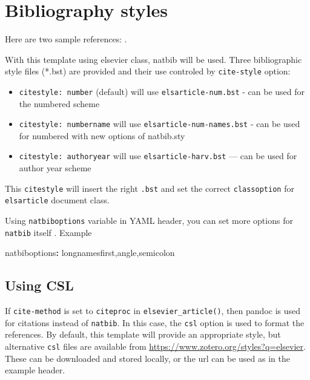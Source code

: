 \documentclass[
  authoryear,
  preprint]{elsarticle}
\newenvironment{Shaded}{\begin{snugshade}}{\end{snugshade}}
\newcommand{\AttributeTok}[1]{\textcolor[rgb]{0.40,0.45,0.13}{#1}}
\newcommand{\FunctionTok}[1]{\textcolor[rgb]{0.28,0.35,0.67}{#1}}
\newcommand{\KeywordTok}[1]{\textcolor[rgb]{0.00,0.23,0.31}{\textbf{#1}}}
\providecommand{\tightlist}{%
  \setlength{\itemsep}{0pt}\setlength{\parskip}{0pt}}\usepackage{longtable,booktabs,array}
\begin{document}
\section{Bibliography styles}\label{bibliography-styles}

Here are two sample references: \citet{Feynman1963118}
\citet{Dirac1953888}.

With this template using elsevier class, natbib will be used. Three
bibliographic style ﬁles (*.bst) are provided and their use controled by
\texttt{cite-style} option:

\begin{itemize}
\tightlist
\item
  \texttt{citestyle:\ number} (default) will use
  \texttt{elsarticle-num.bst} - can be used for the numbered scheme
\item
  \texttt{citestyle:\ numbername} will use
  \texttt{elsarticle-num-names.bst} - can be used for numbered with new
  options of natbib.sty
\item
  \texttt{citestyle:\ authoryear} will use \texttt{elsarticle-harv.bst}
  --- can be used for author year scheme
\end{itemize}

This \texttt{citestyle} will insert the right \texttt{.bst} and set the
correct \texttt{classoption} for \texttt{elsarticle} document class.

Using \texttt{natbiboptions} variable in YAML header, you can set more
options for \texttt{natbib} itself . Example

\begin{Shaded}
\begin{Highlighting}[]
\FunctionTok{natbiboptions}\KeywordTok{:}\AttributeTok{ longnamesfirst,angle,semicolon}
\end{Highlighting}
\end{Shaded}

\subsection{Using CSL}\label{using-csl}

If \texttt{cite-method} is set to \texttt{citeproc} in
\texttt{elsevier\_article()}, then pandoc is used for citations instead
of \texttt{natbib}. In this case, the \texttt{csl} option is used to
format the references. By default, this template will provide an
appropriate style, but alternative \texttt{csl} files are available from
\url{https://www.zotero.org/styles?q=elsevier}. These can be downloaded
and stored locally, or the url can be used as in the example header.
\end{document}
